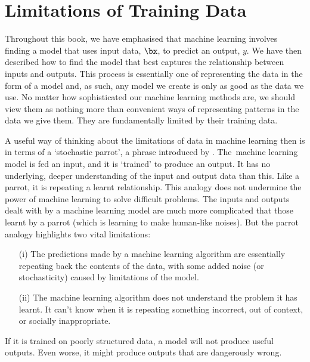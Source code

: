 



\section{Limitations of Training Data}

Throughout this book, we have emphasised that machine learning involves finding a model that uses input data, $\bx$, to predict an output, $y$. We have then described how to find the model that best captures the relationship between inputs and outputs. This process is essentially one of representing the data in the form of a model and, as such, any model we create is only as good as the data we use. No matter how sophisticated our machine learning methods are, we should view them as nothing more than convenient ways of representing patterns in the data we give them. They are fundamentally limited by their training data.

A useful way of thinking about the limitations of data in machine learning then is in terms of a `stochastic parrot', a phrase introduced by \textcite{bender2021dangers}. The~machine learning model is fed an input, and it is `trained' to produce an output. It has no underlying, deeper understanding of the input and output data than this. Like a parrot, it is repeating a learnt relationship. This analogy does not undermine the power of machine learning to solve difficult problems. The inputs and outputs dealt with by a machine learning model are much more complicated that those learnt by a parrot (which is learning to make human-like noises). But the parrot analogy highlights two vital limitations:
\begin{enumerate}
\item[(i)] The predictions made by a machine learning algorithm are essentially repeating back the contents of the data, with some added noise (or stochasticity) caused by limitations of the model.
\item[(ii)] The machine learning algorithm does not understand the problem it has learnt. It can't know when it is repeating something incorrect, out of context, or socially inappropriate.
\end{enumerate}
If it is trained on poorly structured data, a model will not produce useful outputs. Even worse, it might produce outputs that are dangerously wrong.

